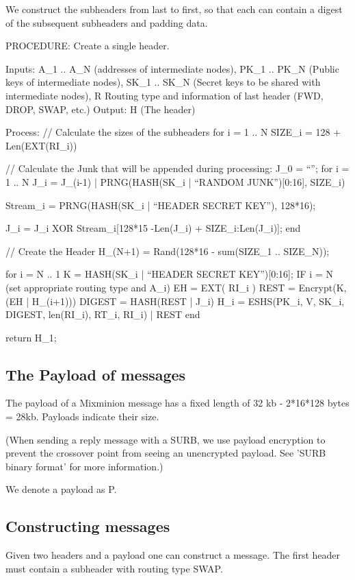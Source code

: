 We construct the subheaders from last to first, so that each can contain
a digest of the subsequent subheaders and padding data.

PROCEDURE: Create a single header.

Inputs: A_1 .. A_N (addresses of intermediate nodes), 
	PK_1 .. PK_N (Public keys of intermediate nodes),
	SK_1 .. SK_N (Secret keys to be shared with intermediate nodes),
        R Routing type and information of last header (FWD, DROP, SWAP, etc.)
Output: H (The header)

Process: 
  // Calculate the sizes of the subheaders
  for i = 1 .. N
	SIZE_i = 128 + Len(EXT(RI_i))

  // Calculate the Junk that will be appended during processing:
  J_0 = ``'';
  for i = 1 .. N
	J_i = J_(i-1) | PRNG(HASH(SK_i | ``RANDOM JUNK'')[0:16], SIZE_i)

        Stream_i = PRNG(HASH(SK_i | ``HEADER SECRET KEY''), 128*16);

	J_i = J_i XOR Stream_i[128*15 -Len(J_i) + SIZE_i:Len(J_i)];
  end

  // Create the Header
  H_(N+1) = Rand(128*16 - sum(SIZE_1 .. SIZE_N));

  for i = N .. 1
	K = HASH(SK_i | ``HEADER SECRET KEY'')[0:16];
	IF i = N (set appropriate routing type and A_i)
	EH = EXT( RI_i )
        REST = Encrypt(K, (EH | H_(i+1)))
  	DIGEST = HASH(REST | J_i)
	H_i = ESHS(PK_i, V, SK_i, DIGEST, len(RI_i), RT_i, RI_i) | REST
  end

return H_1;

\subsection{The Payload of messages}

The payload of a Mixminion message has a fixed length of 32 kb
- 2*16*128 bytes = 28kb.   Payloads indicate their size.

(When sending a reply message with a SURB, we use payload encryption
to prevent the crossover point from seeing an unencrypted payload. See
'SURB binary format' for more information.)

We denote a payload as P.

\subsection{Constructing messages}

Given two headers and a payload one can construct a
message. The first header must contain a subheader
with routing type SWAP.  

